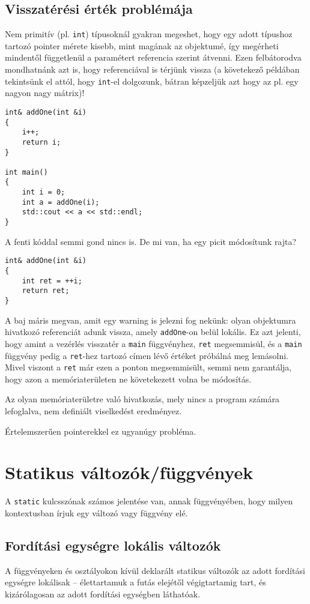 \documentclass[a4paper,11.5pt,table]{article}
\begin{document}
	\subsection{Visszatérési érték problémája}
	Nem primitív (pl. \texttt{int}) típusoknál gyakran megeshet, hogy egy adott típushoz tartozó pointer mérete kisebb, mint magának az objektumé, így megérheti mindentől függetlenül a paramétert referencia szerint átvenni. Ezen felbátorodva mondhatnánk azt is, hogy referenciával is térjünk vissza (a követekező példában tekintsünk el attól, hogy \texttt{int}-el dolgozunk, bátran képzeljük azt hogy az pl. egy nagyon nagy mátrix)!
	\begin{lstlisting}
int& addOne(int &i)
{
	i++;
	return i;
}

int main()
{
	int i = 0;
	int a = addOne(i);
	std::cout << a << std::endl;
}
	\end{lstlisting}
	A fenti kóddal semmi gond nincs is. De mi van, ha egy picit módosítunk rajta?
	\begin{lstlisting}
int& addOne(int &i)
{
	int ret = ++i;
	return ret;
}
	\end{lstlisting}
	A baj máris megvan, amit egy warning is jelezni fog nekünk: olyan objektumra hivatkozó referenciát adunk vissza, amely \texttt{addOne}-on belül lokális. Ez azt jelenti, hogy amint a vezérlés visszatér a \texttt{main} függvényhez, \texttt{ret} megsemmisül, és a \texttt{main} függvény pedig a \texttt{ret}-hez tartozó címen lévő értéket próbálná meg lemásolni. Mivel viszont a \texttt{ret} már ezen a ponton megsemmisült, semmi nem garantálja, hogy azon a memóriaterületen ne követekezett volna be módosítás.
	
	\medskip
	Az olyan memóriaterületre való hivatkozás, mely nincs a program számára lefoglalva, nem definiált viselkedést eredményez.
	\begin{note}
		Értelemszerűen pointerekkel ez ugyanúgy probléma.
	\end{note}
	\section{Statikus változók/függvények}
	A \texttt{static} kulcsszónak számos jelentése van, annak függvényében, hogy milyen kontextusban írjuk egy változó vagy függvény elé. 
	\subsection{Fordítási egységre lokális változók}
	A függvényeken és osztályokon kívül deklarált statikus változók az adott fordítási egységre lokálisak -- élettartamuk a futás elejétől végigtartamig tart, és kizárólagosan az adott fordítási egységben láthatóak.
	\medskip
	
\end{document}
